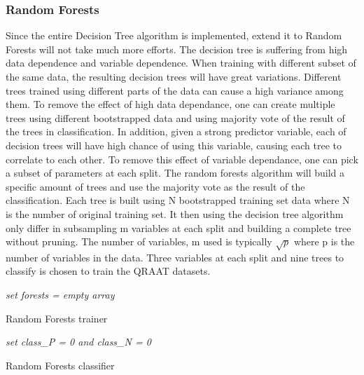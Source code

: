 \documentclass[twoside]{article}
\begin{document}
\subsubsection{Random Forests}
Since the entire Decision Tree algorithm is implemented, extend it to Random Forests will not take much more efforts. The decision tree is suffering from high data dependence and variable dependence. When training with different subset of the same data, the resulting decision trees will have great variations. Different trees trained using different parts of the data can cause a high variance among them. To remove the effect of high data dependance, one can create multiple trees using different bootstrapped data and using majority vote of the result of the trees in classification. In addition, given a strong predictor variable, each of decision trees will have high chance of using this variable, causing each tree to correlate to each other. To remove this effect of variable dependance, one can pick a subset of parameters at each split. The random forests algorithm will build a specific amount of trees and use the majority vote as the result of the classification. Each tree is built using N bootstrapped training set data where N is the number of original training set. It then using the decision tree algorithm only differ in subsampling m variables at each split and building a complete tree without pruning. The number of variables, m used is typically $\sqrt{p}$ where p is the number of variables in the data. Three variables at each split and nine trees to classify is chosen to train the QRAAT datasets.


\IncMargin{1em}
\begin{algorithm}
\BlankLine
\emph{set forests = empty array}\;
\caption{Random Forests trainer}\label{RFt}
\end{algorithm}\DecMargin{1em}

\IncMargin{1em}
\begin{algorithm}
\BlankLine
\emph{set class\_P = 0 and class\_N = 0}\;
\caption{Random Forests classifier}\label{RFc}
\end{algorithm}\DecMargin{1em}
\end{document}
